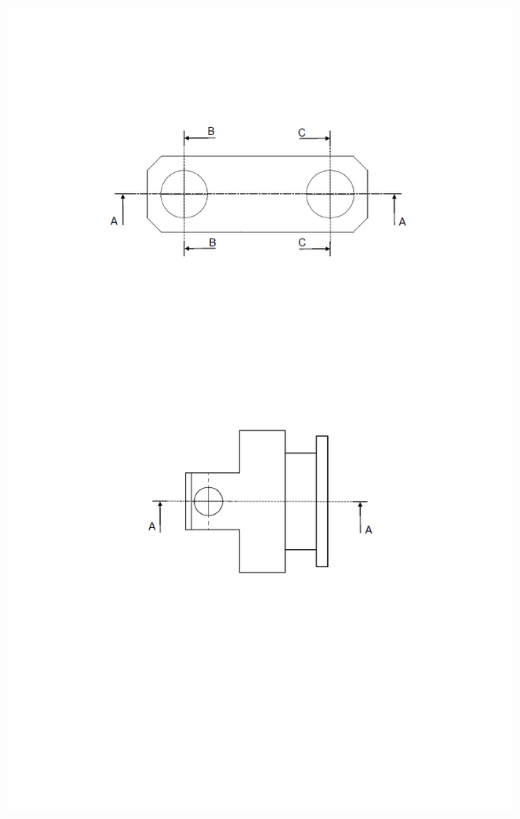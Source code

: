 \documentclass[11pt,oneside]{article}
\begin{document}
\begin{center}
\includegraphics[height=\textheight]{png/fig13}
\end{center}
\end{document}
